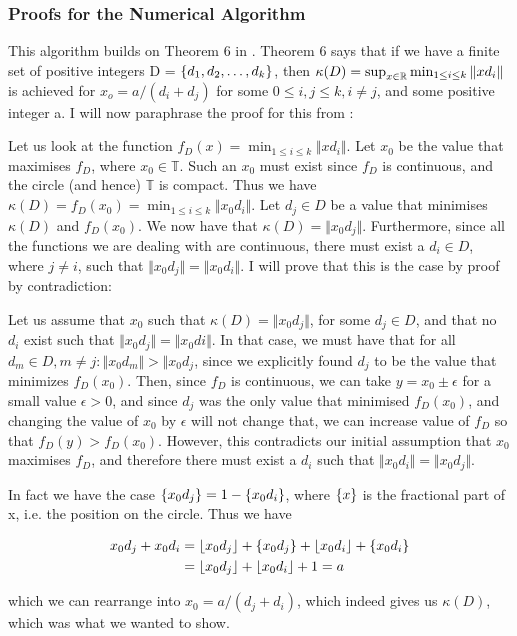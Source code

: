 \subsubsection{Proofs for the Numerical Algorithm}
\label{proof_num}
\begin{theo}[Correctness:]
This algorithm builds on Theorem 6 in \cite{invis}. Theorem 6 says that if we have a finite set of positive integers D = $\{d_1, d_2, \ldots, d_k\}$, then  $\kappa(D) = \sup_{x \in \mathbb{R}}\min_{1\leq i \leq k}\Vert x d_i \Vert$ is achieved for $x_o = a/(d_i + d_j)$ for some $0 \leq i,j \leq k, i \neq j$, and some positive integer a. I will now paraphrase the proof for this from \cite{invis}:

Let us look at the function $f_D(x) = \min_{1 \leq i \leq k}\Vert x d_i \Vert$. Let $x_0$ be the value that maximises $f_D$, where $x_0 \in \mathbb{T}$. Such an $x_0$ must exist since $f_D$ is continuous, and the circle (and hence) $\mathbb{T}$ is compact. Thus we have $\kappa(D) = f_D(x_0) = \min_{1 \leq i \leq k} \Vert x_0 d_i \Vert$. Let $d_j \in D$ be a value that minimises $\kappa(D)$ and $f_D(x_0)$. We now have that $\kappa(D) = \Vert x_0 d_j\Vert$. 
Furthermore, since all the functions we are dealing with are continuous, there must exist a $d_i \in D$, where $j \neq i$, such that $\Vert x_0 d_j \Vert = \Vert x_0 d_i \Vert$. I will prove that this is the case by proof by contradiction:

Let us assume that $x_0$ such that $\kappa(D) = \Vert x_0 d_j \Vert$, for some $d_j \in D$, and that no $d_i$ exist such that $\Vert x_0 d_j \Vert = \Vert x_0 di\Vert$. In that case, we must have that for all $d_m \in D, m \neq j: \Vert x_0 d_m \Vert > \Vert x_0 d_j$, since we explicitly found $d_j$ to be the value that minimizes $f_D(x_0)$. Then, since $f_D$ is continuous, we can take $y = x_0 \pm \epsilon$ for a small value $\epsilon > 0$, and since $d_j$ was the only value that minimised $f_D(x_0)$, and changing the value of $x_0$ by $\epsilon$ will not change that, we can increase value of $f_D$ so that $f_D(y) > f_D(x_0)$. However, this contradicts our initial assumption that $x_0$ maximises $f_D$, and therefore there must exist a $d_i$ such that $\Vert x_0 d_i \Vert = \Vert x_0 d_j \Vert$.  
 
In fact we have the case $\{x_0 d_j\} = 1 - \{x_0 d_i\}$, where $\{x\}$ is the fractional part of x, i.e. the position on the circle. Thus we have 

\begin{equation}
\begin{split}
x_0d_j + x_0d_i &= \lfloor x_0d_j \rfloor + \{x_0d_j\} + \lfloor x_0d_i \rfloor + \{x_0d_i\} \\
               &= \lfloor x_0d_j \rfloor + \lfloor x_0d_i \rfloor + 1 = a
\end{split} 
\end{equation}

which we can rearrange into $x_0 = a / (d_j + d_i)$, which indeed gives us $\kappa(D)$, which was what we wanted to show.
\end{theo}

